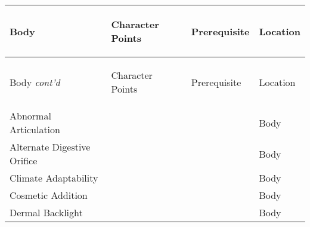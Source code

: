 \documentclass[twoside]{book}
\begin{document}
\begin{longtable}{p{1.25in}p{2em}ll} 
  Body
  &
  \begin{turn}{70}{Character Points}\end{turn}
          
  &
  \begin{turn}{70}{Prerequisite}\end{turn}
          
  &
  \begin{turn}{70}{Location}\end{turn}
          
  \\
  \hline
  \hline
  \endfirsthead
  Body \textit{cont'd}
        
  &
  \begin{turn}{70}{Character Points}\end{turn}
          
  &
  \begin{turn}{70}{Prerequisite}\end{turn}
          
  &
  \begin{turn}{70}{Location}\end{turn}
          
  \\
  \endhead
      
  \raggedright
           Abnormal Articulation 
  &
  
  &
  
  &
   Body 
  \tabularnewline
  \hline
      
  \raggedright
           Alternate Digestive Orifice
           
  &
  
  &
  
  &
   Body 
  \tabularnewline
  \hline
      
  \raggedright
           Climate Adaptability 
  &
  
  &
  
  &
   Body 
  \tabularnewline
  \hline
      
  \raggedright
           Cosmetic Addition 
  &
  
  &
  
  &
   Body 
  \tabularnewline
  \hline
      
  \raggedright
           Dermal Backlight 
  &
  
  &
  
  &
   Body 
  \tabularnewline
  \hline
      

\end{longtable}
\end{document}
